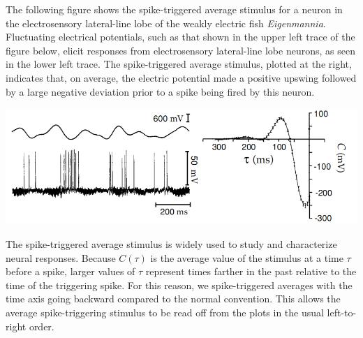 \begin{exm}
  \label{exm:spi-tri-ave in elefish}
  The following figure shows the spike-triggered average stimulus for a neuron in the electrosensory lateral-line lobe of the weakly electric fish \emph{Eigenmannia}.
  Fluctuating electrical potentials, such as that shown in the upper left trace of the figure below,
  elicit responses from electrosensory lateral-line lobe neurons, as seen in the lower left trace. The spike-triggered average stimulus, plotted at the right, indicates that, on average, the electric potential made a positive upswing followed by a large negative deviation prior to a spike being fired by this neuron.
\end{exm}
\begin{center}
  \includegraphics[scale=0.44]{./png/spiTriAvST-elefish.png}
  \label{fig:1.9}
\end{center}

\begin{rem}
   The spike-triggered average stimulus is widely used to study and characterize neural responses. Because $C(\tau)$ is the average value of the stimulus at a time $\tau$ before a spike, larger values of $\tau$ represent times farther in the past relative to the time of the triggering spike. For this reason, we spike-triggered averages with the time axis going backward compared to the normal convention. This allows the average spike-triggering stimulus to be read off from the plots in the usual left-to-right order.
\end{rem}

